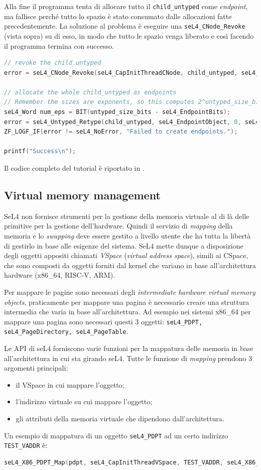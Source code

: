 Alla fine il programma tenta di allocare tutto il \texttt{child\_untyped} come \textit{endpoint}, ma fallisce perché tutto lo spazio è stato consumato dalle allocazioni fatte precedentemente. La soluzione al problema è eseguire una \texttt{seL4\_CNode\_Revoke} (vista sopra) su di esso, in modo che tutto le spazio venga liberato e così facendo il programma termina con successo. 
\begin{lstlisting}[language=C++]
// revoke the child untyped
error = seL4_CNode_Revoke(seL4_CapInitThreadCNode, child_untyped, seL4_WordBits);

// allocate the whole child_untyped as endpoints
// Remember the sizes are exponents, so this computes 2^untyped_size_bits / 2^seL4_EndpointBits:
seL4_Word num_eps = BIT(untyped_size_bits - seL4_EndpointBits);
error = seL4_Untyped_Retype(child_untyped, seL4_EndpointObject, 0, seL4_CapInitThreadCNode, 0, 0, child_tcb, num_eps);
ZF_LOGF_IF(error != seL4_NoError, "Failed to create endpoints.");

printf("Success\n");
\end{lstlisting}
Il codice completo del tutorial è riportato in \cite{untyped}.

\subsection{Virtual memory management}
SeL4 non fornisce strumenti per la gestione della memoria virtuale al di là delle primitive per la gestione dell'hardware. Quindi il servizio di \textit{mapping} della memoria e lo \textit{swapping} deve essere gestito a livello utente che ha tutta la libertà di gestirlo in base alle esigenze del sistema. SeL4 mette dunque a disposizione degli oggetti appositi chiamati \textit{VSpace} (\textit{virtual address space}), simili ai CSpace, che sono composti da oggetti forniti dal kernel che variano in base all'architettura hardware (x86\_64, RISC-V, ARM).

Per mappare le pagine sono necessari degli \textit{intermediate hardware virtual memory objects}, praticamente per mappare una pagina è necessario creare una struttura intermedia che varia in base all'architettura. Ad esempio nei sistemi x86\_64 per mappare una pagina sono necessari questi 3 oggetti: \texttt{seL4\_PDPT, seL4\_PageDirectory, seL4\_PageTable}. 

Le API di seL4 forniscono varie funzioni per la mappatura delle memoria in base all'architettura in cui sta girando seL4. Tutte le funzione di \textit{mapping} prendono 3 argomenti principali:
\begin{itemize}
	\item il VSpace in cui mappare l'oggetto;
	\item l'indirizzo virtuale su cui mappare l'oggetto;
	\item gli attributi della memoria virtuale che dipendono dall'architettura.
\end{itemize}
Un esempio di mappatura di un oggetto \texttt{seL4\_PDPT} ad un certo indirizzo \texttt{TEST\_VADDR} è:
\begin{lstlisting}[language=C++]
seL4_X86_PDPT_Map(pdpt, seL4_CapInitThreadVSpace, TEST_VADDR, seL4_X86_Default_VMAttributes);
\end{lstlisting}

